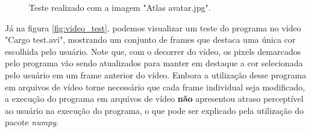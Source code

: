 \documentclass{bmvc2k}
\begin{document}
\begin{figure}
    \centering
    \caption{Teste realizado com a imagem "Atlas avatar.jpg".}
    \label{fig:image_test}
\end{figure}

Já na figura \ref{fig:video_test}, podemos visualizar um teste do programa no vídeo "Cargo test.avi", mostrando um conjunto de frames que destaca uma única cor escolhida pelo usuário. Note que, com o decorrer do vídeo, os pixels demarcados pelo programa vão sendo atualizados para manter em destaque a cor selecionada pelo usuário em um frame anterior do vídeo. Embora a utilização desse programa em arquivos de vídeo torne necessário que cada frame individual seja modificado, a execução do programa em arquivos de vídeo {\bf não} apresentou atraso perceptível ao usuário na execução do programa, o que pode ser explicado pela utilização do pacote {\em numpy}.
\end{document}
